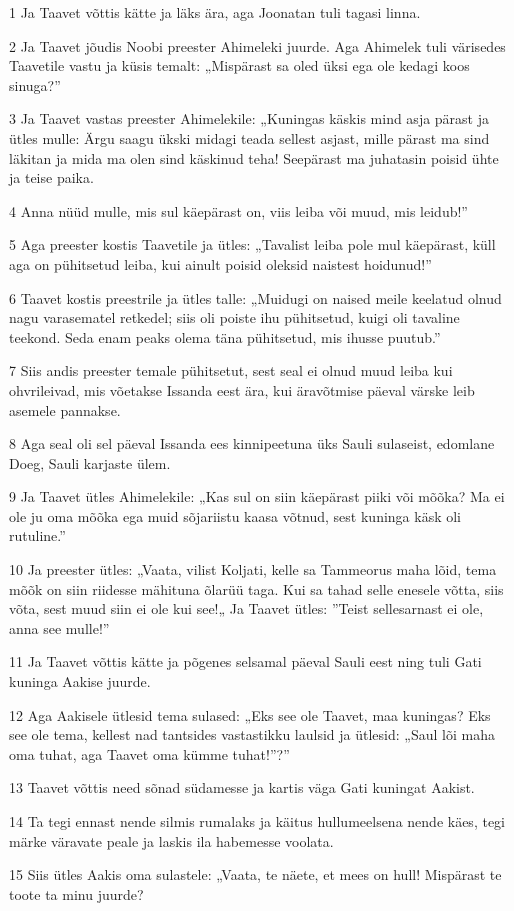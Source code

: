 \par 1 Ja Taavet võttis kätte ja läks ära, aga Joonatan tuli tagasi linna.
\par 2 Ja Taavet jõudis Noobi preester Ahimeleki juurde. Aga Ahimelek tuli värisedes Taavetile vastu ja küsis temalt: „Mispärast sa oled üksi ega ole kedagi koos sinuga?”
\par 3 Ja Taavet vastas preester Ahimelekile: „Kuningas käskis mind asja pärast ja ütles mulle: Ärgu saagu ükski midagi teada sellest asjast, mille pärast ma sind läkitan ja mida ma olen sind käskinud teha! Seepärast ma juhatasin poisid ühte ja teise paika.
\par 4 Anna nüüd mulle, mis sul käepärast on, viis leiba või muud, mis leidub!”
\par 5 Aga preester kostis Taavetile ja ütles: „Tavalist leiba pole mul käepärast, küll aga on pühitsetud leiba, kui ainult poisid oleksid naistest hoidunud!”
\par 6 Taavet kostis preestrile ja ütles talle: „Muidugi on naised meile keelatud olnud nagu varasematel retkedel; siis oli poiste ihu pühitsetud, kuigi oli tavaline teekond. Seda enam peaks olema täna pühitsetud, mis ihusse puutub.”
\par 7 Siis andis preester temale pühitsetut, sest seal ei olnud muud leiba kui ohvrileivad, mis võetakse Issanda eest ära, kui äravõtmise päeval värske leib asemele pannakse.
\par 8 Aga seal oli sel päeval Issanda ees kinnipeetuna üks Sauli sulaseist, edomlane Doeg, Sauli karjaste ülem.
\par 9 Ja Taavet ütles Ahimelekile: „Kas sul on siin käepärast piiki või mõõka? Ma ei ole ju oma mõõka ega muid sõjariistu kaasa võtnud, sest kuninga käsk oli rutuline.”
\par 10 Ja preester ütles: „Vaata, vilist Koljati, kelle sa Tammeorus maha lõid, tema mõõk on siin riidesse mähituna õlarüü taga. Kui sa tahad selle enesele võtta, siis võta, sest muud siin ei ole kui see!„ Ja Taavet ütles: ”Teist sellesarnast ei ole, anna see mulle!”
\par 11 Ja Taavet võttis kätte ja põgenes selsamal päeval Sauli eest ning tuli Gati kuninga Aakise juurde.
\par 12 Aga Aakisele ütlesid tema sulased: „Eks see ole Taavet, maa kuningas? Eks see ole tema, kellest nad tantsides vastastikku laulsid ja ütlesid: „Saul lõi maha oma tuhat, aga Taavet oma kümme tuhat!”?”
\par 13 Taavet võttis need sõnad südamesse ja kartis väga Gati kuningat Aakist.
\par 14 Ta tegi ennast nende silmis rumalaks ja käitus hullumeelsena nende käes, tegi märke väravate peale ja laskis ila habemesse voolata.
\par 15 Siis ütles Aakis oma sulastele: „Vaata, te näete, et mees on hull! Mispärast te toote ta minu juurde?

